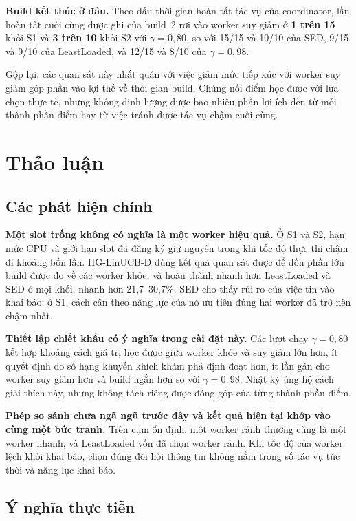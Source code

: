\documentclass[final,5p,times,twocolumn]{elsarticle}
\begin{document}
\textbf{Build kết thúc ở đâu.} Theo dấu thời gian hoàn tất tác vụ của coordinator, lần hoàn tất cuối cùng được ghi của build~2 rơi vào worker suy giảm ở \textbf{1 trên 15} khối S1 và \textbf{3 trên 10} khối S2 với $\gamma=0{,}80$, so với 15/15 và 10/10 của SED, 9/15 và 9/10 của LeastLoaded, và 12/15 và 8/10 của $\gamma=0{,}98$.

Gộp lại, các quan sát này nhất quán với việc giảm mức tiếp xúc với worker suy giảm góp phần vào lợi thế về thời gian build. Chúng nối điểm học được với lựa chọn thực tế, nhưng không định lượng được bao nhiêu phần lợi ích đến từ mỗi thành phần điểm hay từ việc tránh được tác vụ chậm cuối cùng.

\section{Thảo luận}
\label{sec:discussion}

\subsection{Các phát hiện chính}

\textbf{Một slot trống không có nghĩa là một worker hiệu quả.} Ở S1 và S2, hạn mức CPU và giới hạn slot đã đăng ký giữ nguyên trong khi tốc độ thực thi chậm đi khoảng bốn lần. HG-LinUCB-D dùng kết quả quan sát được để dồn phần lớn build được đo về các worker khỏe, và hoàn thành nhanh hơn LeastLoaded và SED ở mọi khối, nhanh hơn 21,7--30,7\%. SED cho thấy rủi ro của việc tin vào khai báo: ở S1, cách cân theo năng lực của nó ưu tiên đúng hai worker đã trở nên chậm nhất.

\textbf{Thiết lập chiết khấu có ý nghĩa trong cài đặt này.} Các lượt chạy $\gamma=0{,}80$ kết hợp khoảng cách giá trị học được giữa worker khỏe và suy giảm lớn hơn, ít quyết định do số hạng khuyến khích khám phá định đoạt hơn, ít lần gán cho worker suy giảm hơn và build ngắn hơn so với $\gamma=0{,}98$. Nhật ký ủng hộ cách giải thích này, nhưng không tách riêng được đóng góp của từng thành phần điểm.

\textbf{Phép so sánh chưa ngã ngũ trước đây và kết quả hiện tại khớp vào cùng một bức tranh.} Trên cụm ổn định, một worker rảnh thường cũng là một worker nhanh, và LeastLoaded vốn đã chọn worker rảnh. Khi tốc độ của worker lệch khỏi khai báo, chọn đúng đòi hỏi thông tin không nằm trong số tác vụ tức thời và năng lực khai báo.

\subsection{Ý nghĩa thực tiễn}
\end{document}
